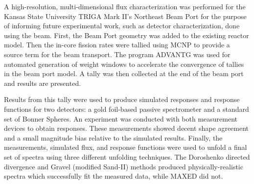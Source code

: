 
\pagestyle{empty}
\setlength{\baselineskip}{0.8cm}



A high-resolution, multi-dimensional flux characterization was performed for the Kansas State University TRIGA Mark II's Northeast Beam Port for the purpose of informing future experimental work, such as detector characterization, done using the beam.
First, the Beam Port geometry was added to the existing reactor model.
Then the in-core fission rates were tallied using MCNP to provide a source term for the beam transport.
The program ADVANTG was used for automated generation of weight windows to accelerate the convergence of tallies in the beam port model.
A tally was then collected at the end of the beam port and results are presented.

Results from this tally were used to produce simulated responses and response functions for two detectors: a gold foil-based passive spectrometer and a standard set of Bonner Spheres.
An experiment was conducted with both measurement devices to obtain responses.
These measurements showed decent shape agreement and a small magnitude bias relative to the simulated results.
Finally, the measurements, simulated flux, and response functions were used to unfold a final set of spectra using three different unfolding techniques.
The Doroshenko directed divergence and Gravel (modified Sand-II) methods produced physically-realistic spectra which successfully fit the measured data, while MAXED did not.

